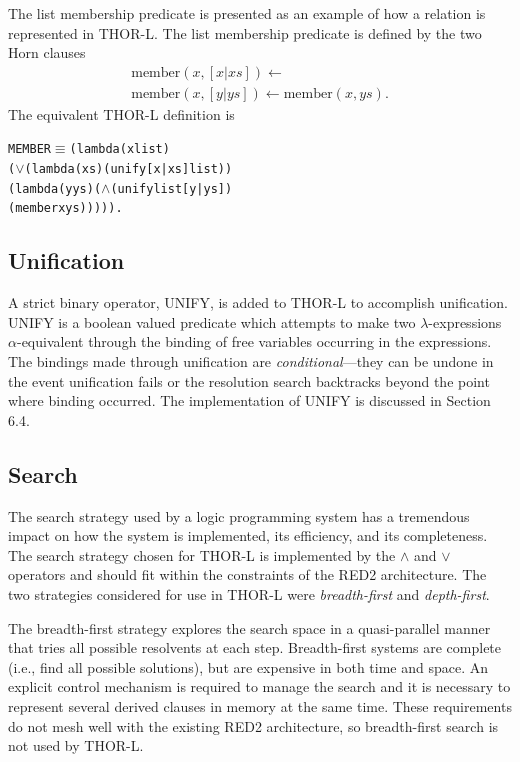 The list membership predicate is presented as an example of how a relation is
represented in THOR-L. The list membership predicate is defined by the two Horn
clauses
\[
\begin{array}{l}
\mathrm{member}(x,[x|\mathit{xs}])\leftarrow\\
\mathrm{member}(x,[y|\mathit{ys}])\leftarrow \mathrm{member}(x,\mathit{ys}).
\end{array}
\]
The equivalent THOR-L definition is
\begin{alltt}
MEMBER \(\equiv\) (lambda (x list)
  (\(\vee\) (lambda (xs) (unify [x|xs] list))
     (lambda (y ys) (\(\wedge\) (unify list [y|ys])
                       (member x ys))))).
\end{alltt}

\subsection{Unification}

A strict binary operator, UNIFY, is added to THOR-L to accomplish unification.
UNIFY is a boolean valued predicate which attempts to make two
\(\lambda\)-expressions \(\alpha\)-equivalent through the binding of free
variables occurring in the expressions. The bindings made through unification
are \emph{conditional}---they can be undone in the event unification fails or the
resolution search backtracks beyond the point where binding occurred. The
implementation of UNIFY is discussed in Section 6.4.

\subsection{Search}

The search strategy used by a logic programming system has a tremendous impact
on how the system is implemented, its efficiency, and its completeness. The
search strategy chosen for THOR-L is implemented by the \(\wedge\) and \(\vee\)
operators and
should fit within the constraints of the RED2 architecture. The two strategies
considered for use in THOR-L were \emph{breadth-first} and \emph{depth-first}.

The breadth-first strategy explores the search space in a quasi-parallel manner
that tries all possible resolvents at each step. Breadth-first systems are
complete (i.e., find all possible solutions), but are expensive in both time and
space. An explicit control mechanism is required to manage the search and it is
necessary to represent several derived clauses in memory at the same time. These
requirements do not mesh well with the existing RED2 architecture, so
breadth-first search is not used by THOR-L.

